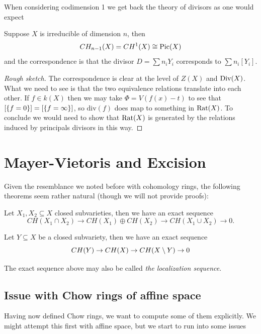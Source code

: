 \noindent
When considering codimension 1 we get back the theory of divisors as one would expect
\begin{proposition}
Suppose $X$ is irreducible of dimension $n$, then
\[CH_{n-1}(X)=CH^1(X)\cong \operatorname{Pic}(X)\]
and the correspondence is that the divisor $D=\sum n_i Y_i$ corresponds to $\sum n_i[Y_i]$.
\end{proposition}
\begin{proof}[Rough sketch]
The correspondence is clear at the level of $Z(X)$ and $\operatorname{Div}(X)$. What we need to see is that the two equivalence relations translate into each other.
If $f\in k(X)$ then we may take $\Phi=V(f(x)-t)$ to see that $[\left\{{f=0}\right\}]=[\left\{{f=\infty}\right\}]$, so $\mathrm{div}(f)$ does map to something in $\mathrm{Rat}(X)$.
To conclude we would need to show that $\mathrm{Rat}(X)$ is generated by the relations induced by principals divisors in this way.
\end{proof}


\section{Mayer-Vietoris and Excision}

Given the resemblance we noted before with cohomology rings, the following theorems seem rather natural (though we will not provide proofs):

\begin{theorem}
Let $X_1,X_2\subseteq X$ closed subvarieties, then we have an exact sequence
\[CH(X_1\cap X_2)\to CH(X_1)\oplus CH(X_2)\to CH(X_1\cup X_2)\to 0.\]
\end{theorem}


\begin{theorem}[Excision]
Let $Y\subseteq X$ be a closed subvariety, then we have an exact sequence
\[CH(Y)\to CH(X)\to CH(X\setminus Y)\to 0\]
\end{theorem}

\begin{remark}
The exact sequence above may also be called \textit{the localization sequence}.
\end{remark}




\subsection{Issue with Chow rings of affine space}

Having now defined Chow rings, we want to compute some of them explicitly. We might attempt this first with affine space, but we start to run into some issues


